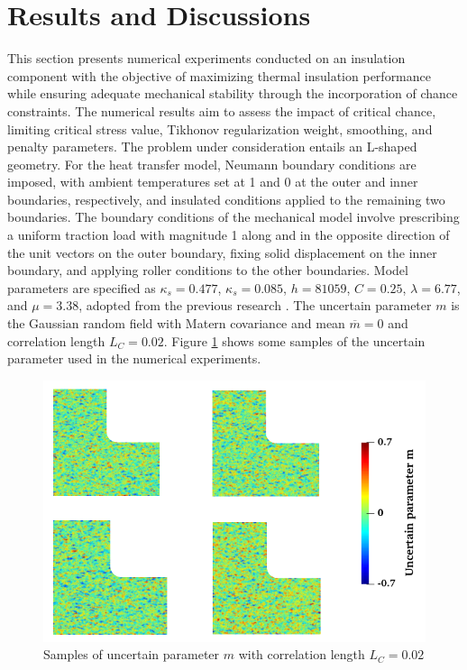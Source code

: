 \documentclass[pdf-a,balance,colorlinks,upint,subscriptcorrection,varvw,mathalfa=cal=boondoxo, spanish,french,vietnamese,russian,greek]{asmeconf}
\begin{document}
\section{Results and Discussions}
\noindent
This section presents numerical experiments conducted on an insulation component with the objective of maximizing thermal insulation performance while ensuring adequate mechanical stability through the incorporation of chance constraints. The numerical results aim to assess the impact of critical chance, limiting critical stress value, Tikhonov regularization weight, smoothing, and penalty parameters.
The problem under consideration entails an L-shaped geometry. For the heat transfer model, Neumann boundary conditions are imposed, with ambient temperatures set at 1 and 0 at the outer and inner boundaries, respectively, and insulated conditions applied to the remaining two boundaries. The boundary conditions of the mechanical model involve prescribing a uniform traction load with magnitude 1 along and in the opposite direction of the unit vectors on the outer boundary, fixing solid displacement on the inner boundary, and applying roller conditions to the other boundaries.
Model parameters are specified as $\kappa_s=0.477$, $\kappa_s=0.085$, $h=81059$, $C=0.25$, $\lambda=6.77$, and $\mu=3.38$, adopted from the previous research \cite{tan2022predictive}. The uncertain parameter $m$ is the Gaussian random field with Matern covariance and mean $\overline{m}=0$ and correlation length $L_{C} = 0.02$. Figure \ref{fig:m_sample} shows some samples of the uncertain parameter used in the numerical experiments.
\begin{figure}[h]
\centering
\includegraphics[width=1\linewidth]{Figures/m_sample.png} 
\caption{Samples of uncertain parameter $m$ with correlation length $L_{C} = 0.02$\label{fig:m_sample}}
\end{figure}
\end{document}
